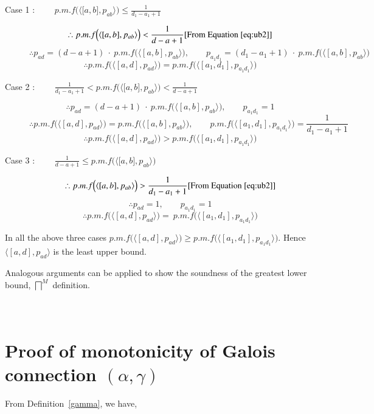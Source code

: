 \documentclass[final,3p, review, times]{Elsevier/elsarticle}
\begin{document}
\begin{description}
	\item[Case 1 : $\qquad\displaystyle p.m.f\Big(\langle\lbrack a,b\rbrack,p_{ab}\rangle\Big)\leq\frac{1}{d_1-a_1+1}$] \hfill
	\[ \therefore \displaystyle p.m.f\Big(\langle[a,b],p_{ab}\rangle\Big)<\frac{1}{d-a+1}\hfill\text{[From Equation~\ref{eq:ub2}]}\]
	\[ \therefore p_{ad}=(d-a+1)\ \cdot\ p.m.f\Big(\langle[a,b],p_{ab}\rangle\Big),\qquad p_{a_1d_1}=(d_1-a_1+1)\ \cdot\ p.m.f\Big(\langle[a,b],p_{ab}\rangle\Big) \]
	\[ \therefore p.m.f\Big(\langle[a,d],p_{ad}\rangle\Big)=p.m.f\Big(\langle[a_1,d_1],p_{a_1d_1}\rangle\Big) \]
	\item[Case 2 : $\qquad\displaystyle \frac{1}{d_1-a_1+1}<p.m.f\Big(\langle\lbrack a,b\rbrack,p_{ab}\rangle\Big)<\frac{1}{d-a+1}$] \hfill
	\[ \therefore p_{ad}=(d-a+1)\ \cdot\ p.m.f\Big(\langle[a,b],p_{ab}\rangle\Big),\qquad p_{a_1d_1}=1 \]
	\[ \therefore p.m.f\Big(\langle[a,d],p_{ad}\rangle\Big)=p.m.f\Big(\langle[a,b],p_{ab}\rangle\Big),\qquad p.m.f\Big(\langle[a_1,d_1],p_{a_1d_1}\rangle\Big)=\frac{1}{d_1-a_1+1} \]
	\[ \therefore p.m.f\Big(\langle[a,d],p_{ad}\rangle\Big)>p.m.f\Big(\langle[a_1,d_1],p_{a_1d_1}\rangle\Big) \]
	\item[Case 3 : $\qquad\displaystyle \frac{1}{d-a+1}\leq p.m.f\Big(\langle\lbrack a,b\rbrack,p_{ab}\rangle\Big)$] \hfill
	\[ \therefore \displaystyle p.m.f\Big(\langle[a,b],p_{ab}\rangle\Big)>\frac{1}{d_1-a_1+1}\hfill\text{[From Equation~\ref{eq:ub2}]} \]
	\[ \therefore p_{ad}=1,\qquad p_{a_1d_1}=1 \]
	\[ \therefore p.m.f\Big(\langle[a,d],p_{ad}\rangle\Big)=\ p.m.f\Big(\langle[a_1,d_1],p_{a_1d_1}\rangle\Big) \]
\end{description}

\noindent In all the above three cases $p.m.f\Big(\langle[a,d],p_{ad}\rangle\Big)\geq p.m.f\Big(\langle[a_1,d_1],p_{a_1d_1}\rangle\Big)$. Hence $\langle[a,d],p_{ad}\rangle$ is the least upper bound.

\noindent Analogous arguments can be applied to show the soundness of the greatest lower bound, $\displaystyle\bigsqcap^M$ definition.






\section{\\Proof of monotonicity of Galois connection $(\alpha,\gamma)$}
\label{app:monotonicity}

From Definition~\ref{gamma}, we have,
\end{document}
